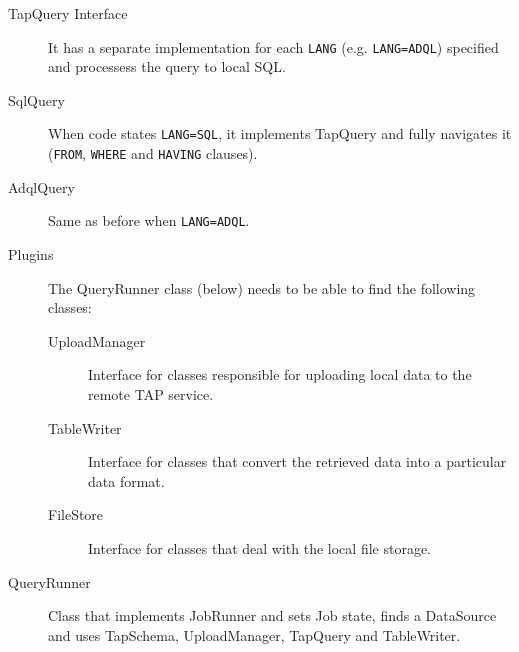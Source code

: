 \begin{description}
	\item[TapQuery Interface] It has a separate implementation for each \texttt{LANG} (e.g. \texttt{LANG=ADQL}) specified and processess the query to local SQL.
	\item[SqlQuery] When code states \texttt{LANG=SQL}, it implements TapQuery and fully navigates it (\texttt{FROM}, \texttt{WHERE} and \texttt{HAVING} clauses).
	
	\item[AdqlQuery] Same as before when \texttt{LANG=ADQL}.
	
	
	\item[Plugins] The QueryRunner class (below) needs to be able to find the following classes:

	\begin{description}
	\item[UploadManager] Interface for classes responsible for uploading local data to the remote TAP service.
	\item[TableWriter] Interface for classes that convert the retrieved data into a particular data format.
	\item[FileStore] Interface for classes that deal with the local file storage.
	\end{description}
	
	\item[QueryRunner] Class that implements JobRunner and sets Job state, finds a DataSource and uses TapSchema, UploadManager, TapQuery and TableWriter.
	
\end{description}







